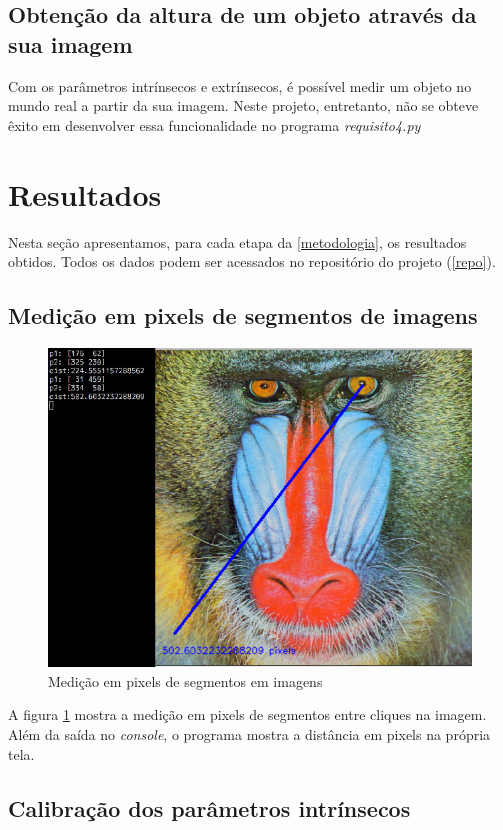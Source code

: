 \documentclass[conference]{IEEEtran}
\begin{document}
\subsection{Obtenção da altura de um objeto através da sua imagem}
Com os parâmetros intrínsecos e extrínsecos,  é possível medir um objeto no mundo real a partir da sua imagem. Neste projeto, entretanto, não se obteve êxito em desenvolver essa funcionalidade no programa \textit{requisito4.py}

\section{Resultados}
Nesta seção apresentamos, para cada etapa da \ref{metodologia}, os resultados obtidos. Todos os dados podem ser acessados no repositório do projeto (\ref{repo}).
\subsection{Medição em pixels de segmentos de imagens}
\begin{figure}[ht!]\label{baboon}
\begin{center}
\includegraphics[width= .5\columnwidth]{baboon.jpg}
\caption{Medição em pixels de segmentos em imagens}
\end{center}
\end{figure}
A figura \ref{baboon} mostra a medição em pixels de segmentos entre cliques na imagem. Além da saída no \textit{console}, o programa mostra a distância em pixels na própria tela.
\subsection{Calibração dos parâmetros intrínsecos}
\end{document}
